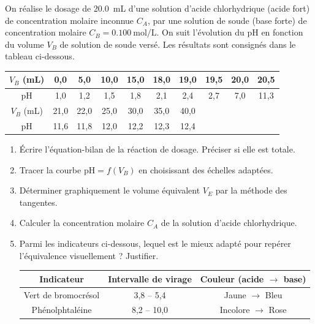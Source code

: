 \documentclass[11pt]{article}
\begin{document}
\begin{exercice}
On réalise le dosage de \SI{20,0}{\milli\liter} d'une solution d'acide chlorhydrique  (acide fort) de concentration molaire inconnue $C_A$, par une solution de soude  (base forte) de concentration molaire $C_B = \SI{0,100}{\mole\per\liter}$. On suit l'évolution du pH en fonction du volume $V_B$ de solution de soude versé. Les résultats sont consignés dans le tableau ci-dessous.

\begin{center}
\begin{tabular}{|c|c|c|c|c|c|c|c|c|c|}
\hline
$V_B$ (\si{\milli\liter}) & 0,0 & 5,0 & 10,0 & 15,0 & 18,0 & 19,0 & 19,5 & 20,0 & 20,5 \\
\hline
pH & 1,0 & 1,2 & 1,5 & 1,8 & 2,1 & 2,4 & 2,7 & 7,0 & 11,3 \\
\hline
\hline
$V_B$ (\si{\milli\liter}) & 21,0 & 22,0 & 25,0 & 30,0 & 35,0 & 40,0 &  &  &  \\
\hline
pH & 11,6 & 11,8 & 12,0 & 12,2 & 12,3 & 12,4 &  &  &  \\
\hline
\end{tabular}
\end{center}

\begin{enumerate}
    \item Écrire l'équation-bilan de la réaction de dosage. Préciser si elle est totale.
    \item Tracer la courbe $\text{pH} = f(V_B)$ en choisissant des échelles adaptées. 
    \item Déterminer graphiquement le volume équivalent $V_{E}$ par la méthode des tangentes. 
    \item Calculer la concentration molaire $C_A$ de la solution d'acide chlorhydrique.
    \item Parmi les indicateurs ci-dessous, lequel est le mieux adapté pour repérer l'équivalence visuellement ? Justifier.
    \begin{center}
    \begin{tabular}{|c|c|c|}
    \hline
    Indicateur & Intervalle de virage & Couleur (acide $\to$ base) \\
    \hline
    Vert de bromocrésol & 3,8 -- 5,4 & Jaune $\to$ Bleu \\
    \hline
    Phénolphtaléine & 8,2 -- 10,0 & Incolore $\to$ Rose \\
    \hline
    \end{tabular}
    \end{center}
\end{enumerate}
\end{exercice}
\end{document}
